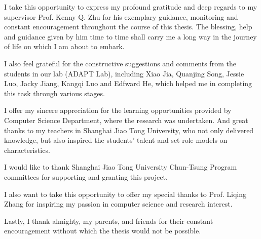 I take this opportunity to express my profound gratitude and deep regards to my supervisor Prof. Kenny Q. Zhu for his exemplary guidance, monitoring and constant encouragement throughout the course of this thesis. The blessing, help and guidance given by him time to time shall carry me a long way in the journey of life on which I am about to embark.

I also feel grateful for the constructive suggestions and comments from the students in our lab (ADAPT Lab), including Xiao Jia, Quanjing Song, Jessie Luo, Jacky Jiang, Kangqi Luo and Edfward He, which helped me in completing this task through various stages.

I offer my sincere appreciation for the learning opportunities provided by Computer Science Department, where the research was undertaken. And great thanks to my teachers in Shanghai Jiao Tong University, who not only delivered knowledge, but also inspired the students' talent and set role models on characteristics.

I would like to thank Shanghai Jiao Tong University Chun-Tsung Program committees for supporting and granting this project.

I also want to take this opportunity to offer my special thanks to Prof. Liqing Zhang for inspiring my passion in computer science and research interest.

Lastly, I thank almighty, my parents, and friends for their constant encouragement without which the thesis would not be possible.

